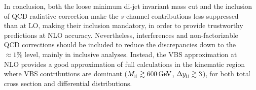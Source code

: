 In conclusion, both the loose minimum di-jet invariant mass cut and the inclusion of QCD radiative correction make the $s$-channel contributions less suppressed than at LO, making their inclusion mandatory, in order to provide trustworthy predictions at NLO accuracy.
Nevertheless, interferences and non-factorizable QCD corrections should be included to reduce the discrepancies down to the $\approx 1\%$  level, mainly in inclusive analyses.
Instead, the VBS approximation at NLO provides a good approximation of full calculations in the kinematic region where VBS contributions are dominant ($M_{\text{j}\text{j}} \gtrsim 600 \,\text{GeV}$, $\Delta y_{\text{j}\text{j}} \gtrsim 3$), for both total cross section and differential distributions.
